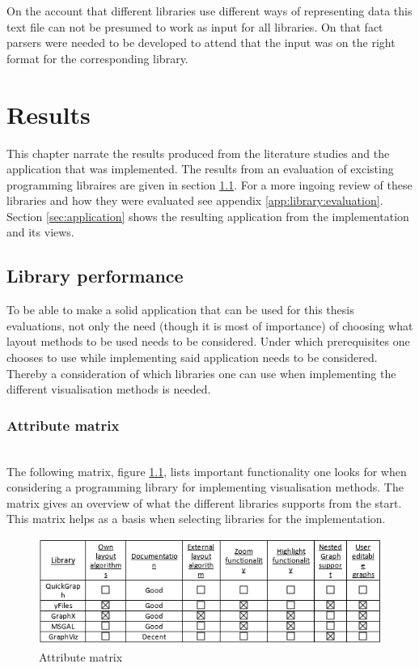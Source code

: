 \documentclass[a4paper,11pt]{kth-mag}
\begin{document}
On the account that different libraries use different ways of representing data this text file can not be presumed to work as input for all libraries. On that fact parsers were needed to be developed to
attend that the input was on the right format for the corresponding library.
\chapter{Results}
\label{chap:results}
This chapter narrate the results produced from the literature studies and the application that was implemented. The results from an evaluation of excisting programming
libraires are given in section \ref{sec:libperform}. For a more ingoing review of these libraries and how they were evaluated see appendix \ref{app:library:evaluation}. 
Section \ref{sec:application} shows the resulting application from the implementation and its views.  
\section{Library performance}
\label{sec:libperform}
To be able to make a solid application that can be used for this thesis evaluations, not only the need (though it is most of importance) of choosing what layout methods to be used needs to be considered. Under which prerequisites
one chooses to use while implementing said application needs to be considered. Thereby a consideration of which libraries one can use when implementing the different visualisation methods is needed.
\subsection{Attribute matrix}
\label{Lib:attribute}
\newline
\\
The following matrix, figure \ref{fig:AttributeMatrix}, lists important functionality one looks for when considering a programming library for implementing visualisation methods. The matrix gives an overview of what the 
different libraries supports from the start. This matrix helps as a basis when selecting libraries for the implementation.\\

\begin{figure}[!htbp]
	\centering
	\includegraphics[scale=1.0]{LibraryAttributeMatrix}
	\caption{Attribute matrix}
	\label{fig:AttributeMatrix}
\end{figure}
\end{document}
